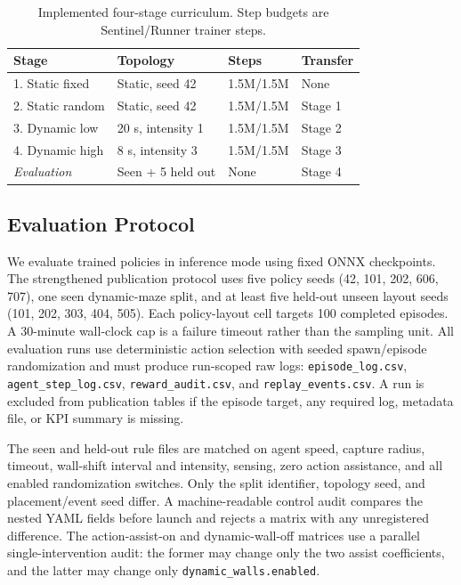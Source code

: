 \documentclass[journal]{IEEEtran}
\begin{document}
\begin{table}[t]
\centering
\caption{Implemented four-stage curriculum. Step budgets are Sentinel/Runner trainer steps.}
\label{tab:curriculum}
\begin{tabular}{p{2.0cm}p{1.7cm}p{1.45cm}p{1.35cm}}
\toprule
Stage & Topology & Steps & Transfer \\
\midrule
1. Static fixed & Static, seed 42 & 1.5M/1.5M & None \\
2. Static random & Static, seed 42 & 1.5M/1.5M & Stage 1 \\
3. Dynamic low & 20 s, intensity 1 & 1.5M/1.5M & Stage 2 \\
4. Dynamic high & 8 s, intensity 3 & 1.5M/1.5M & Stage 3 \\
\midrule
\textit{Evaluation} & Seen + 5 held out & None & Stage 4 \\
\bottomrule
\end{tabular}
\end{table}

\subsection{Evaluation Protocol}

We evaluate trained policies in inference mode using fixed ONNX checkpoints. The strengthened publication protocol uses five policy seeds (42, 101, 202, 606, 707), one seen dynamic-maze split, and at least five held-out unseen layout seeds (101, 202, 303, 404, 505). Each policy-layout cell targets 100 completed episodes. A 30-minute wall-clock cap is a failure timeout rather than the sampling unit. All evaluation runs use deterministic action selection with seeded spawn/episode randomization and must produce run-scoped raw logs: \texttt{episode\_log.csv}, \texttt{agent\_step\_log.csv}, \texttt{reward\_audit.csv}, and \texttt{replay\_events.csv}. A run is excluded from publication tables if the episode target, any required log, metadata file, or KPI summary is missing.

The seen and held-out rule files are matched on agent speed, capture radius, timeout, wall-shift interval and intensity, sensing, zero action assistance, and all enabled randomization switches. Only the split identifier, topology seed, and placement/event seed differ. A machine-readable control audit compares the nested YAML fields before launch and rejects a matrix with any unregistered difference. The action-assist-on and dynamic-wall-off matrices use a parallel single-intervention audit: the former may change only the two assist coefficients, and the latter may change only \texttt{dynamic\_walls.enabled}.
\end{document}
